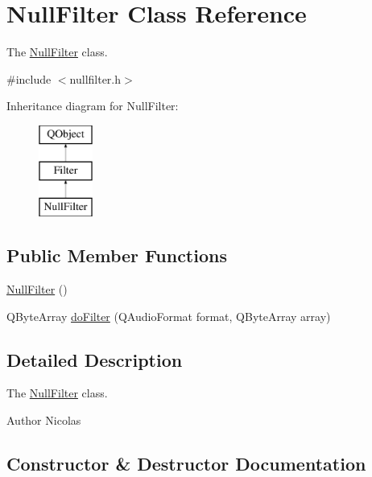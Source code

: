 \hypertarget{class_null_filter}{}\section{Null\+Filter Class Reference}
\label{class_null_filter}


The \hyperlink{class_null_filter}{Null\+Filter} class.  




{\ttfamily \#include $<$nullfilter.\+h$>$}

Inheritance diagram for Null\+Filter\+:\begin{figure}[H]
\begin{center}
\leavevmode
\includegraphics[height=3.000000cm]{class_null_filter}
\end{center}
\end{figure}
\subsection*{Public Member Functions}
\begin{DoxyCompactItemize}
\item 
\hyperlink{class_null_filter_aaddca4e32038999a377a4a8a37531d85}{Null\+Filter} ()
\item 
Q\+Byte\+Array \hyperlink{class_null_filter_a738c372168e34415189cb289ead46479}{do\+Filter} (Q\+Audio\+Format format, Q\+Byte\+Array array)
\end{DoxyCompactItemize}


\subsection{Detailed Description}
The \hyperlink{class_null_filter}{Null\+Filter} class. 

\begin{DoxyAuthor}{Author}
Nicolas 
\end{DoxyAuthor}


\subsection{Constructor \& Destructor Documentation}
\hypertarget{class_null_filter_aaddca4e32038999a377a4a8a37531d85}{}\label{class_null_filter_aaddca4e32038999a377a4a8a37531d85} 

